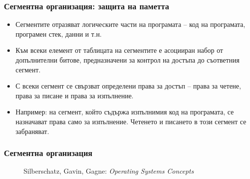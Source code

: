 \documentclass[ignorenonframetext, hyperref=unicode]{beamer}
\begin{document}
\begin{frame}
\frametitle{Сегментна организация: защита на паметта}
\begin{itemize}
  \item Сегментите отразяват логическите части на програмата -- код на
  програмата, програмен стек, данни и т.н.
  \item Към всеки елемент от таблицата на сегментите е асоцииран набор от
  допълнителни битове, предназначени за контрол на достъпа до съответния
  сегмент.
  \item С всеки сегмент се свързват определени права за достъп -- права за
  четене, права за писане и права за изпълнение.
  \item Например: на сегмент, който съдържа изпълнимия код на програмата, се
  назначават права само за изпълнение. Четенето и писането в този
  сегмент се забраняват.
\end{itemize}
\end{frame}

\begin{frame}
\frametitle{Сегментна организация}
\begin{figure}[h]
\center
{}
\caption{Silberschatz, Gavin, Gagne: {\em Operating Systems Concepts}}
\end{figure}
\end{frame}
\end{document}
